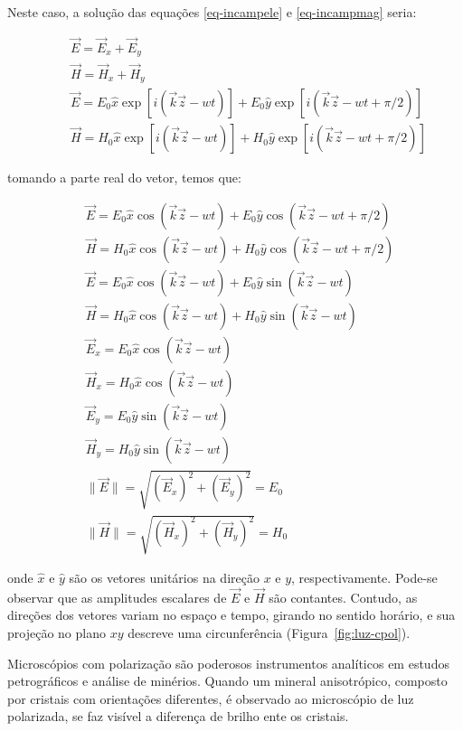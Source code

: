  Neste caso, a solução das equações \eqref{eq-incampele} e
 \eqref{eq-incampmag} seria:

\begin{align}
 &~~~~~~\vec{E}  = \vec{E}_{x} + \vec{E}_{y} \\
 &~~~~~~\vec{H}  = \vec{H}_{x} + \vec{H}_{y} \\
 &~~~~~~\vec{E}  = E_{0}\hat{x}\exp[i(\vec{k}\vec{z}-wt)] + E_{0}\hat{y}\exp[i(\vec{k}\vec{z}-wt+\pi/2)]\\
 &~~~~~~\vec{H}  = H_{0}\hat{x}\exp[i(\vec{k}\vec{z}-wt)] + H_{0}\hat{y}\exp[i(\vec{k}\vec{z}-wt+\pi/2)]
\end{align}

tomando a parte real do vetor, temos que:

\begin{align}
 &\vec{E} = E_{0}\hat{x}\cos(\vec{k}\vec{z}-wt) + E_{0}\hat{y}\cos(\vec{k}\vec{z}-wt+\pi/2)\\
 &\vec{H} = H_{0}\hat{x}\cos(\vec{k}\vec{z}-wt) + H_{0}\hat{y}\cos(\vec{k}\vec{z}-wt+\pi/2)\\
 &\vec{E} = E_{0}\hat{x}\cos(\vec{k}\vec{z}-wt) + E_{0}\hat{y}\sin(\vec{k}\vec{z}-wt) \label{eq-ec}\\
 &\vec{H} = H_{0}\hat{x}\cos(\vec{k}\vec{z}-wt) + H_{0}\hat{y}\sin(\vec{k}\vec{z}-wt) \label{eq-hc}\\
 &\vec{E}_{x} = E_{0}\hat{x}\cos(\vec{k}\vec{z}-wt)\label{eq-ex}\\
 &\vec{H}_{x} = H_{0}\hat{x}\cos(\vec{k}\vec{z}-wt)\label{eq-hx}\\
 &\vec{E}_{y} = E_{0}\hat{y}\sin(\vec{k}\vec{z}-wt)\label{eq-ey}\\
 &\vec{H}_{y} = H_{0}\hat{y}\sin(\vec{k}\vec{z}-wt)\label{eq-hy}\\
 &\|\vec{E}\| =\sqrt{(\vec{E}_{x})^2+(\vec{E}_{y})^2} = E_{0}\label{eq-er}\\
 &\|\vec{H}\| =\sqrt{(\vec{H}_{x})^2+(\vec{H}_{y})^2} = H_{0}\label{eq-hr}
\end{align}

onde $\hat{x}$ e $\hat{y}$ são os vetores unitários na direção $x$ e
$y$, respectivamente. Pode-se observar que as amplitudes escalares de
$\vec{E}$ e $\vec{H}$ são contantes. Contudo, as direções dos vetores
variam no espaço e tempo, girando no sentido horário, e sua projeção
no plano $xy$ descreve uma circunferência (Figura~\ref{fig:luz-cpol}).

Microscópios com polarização são poderosos instrumentos analíticos em
estudos petrográficos e análise de minérios.\cite{50} Quando um
mineral anisotrópico, composto por cristais com orientações
diferentes, é observado ao microscópio de luz polarizada, se faz
visível a diferença de brilho ente os cristais.

